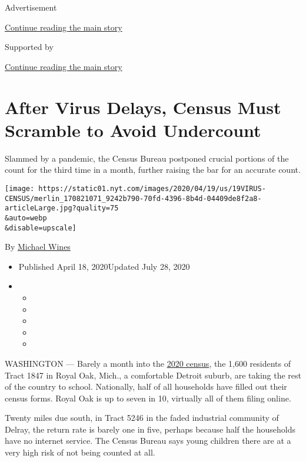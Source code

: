 Advertisement

\protect\hyperlink{after-top}{Continue reading the main story}

Supported by

\protect\hyperlink{after-sponsor}{Continue reading the main story}

\hypertarget{after-virus-delays-census-must-scramble-to-avoid-undercount}{%
\section{After Virus Delays, Census Must Scramble to Avoid
Undercount}\label{after-virus-delays-census-must-scramble-to-avoid-undercount}}

Slammed by a pandemic, the Census Bureau postponed crucial portions of
the count for the third time in a month, further raising the bar for an
accurate count.

\texttt{[image: https://static01.nyt.com/images/2020/04/19/us/19VIRUS-CENSUS/merlin\_170821071\_9242b790-70fd-4396-8b4d-04409de8f2a8-articleLarge.jpg?quality=75\\\&auto=webp\\\&disable=upscale]}

By \href{https://www.nytimes.com/by/michael-wines}{Michael Wines}

\begin{itemize}
\item
  Published April 18, 2020Updated July 28, 2020
\item
  \begin{itemize}
  \item
  \item
  \item
  \item
  \item
  \end{itemize}
\end{itemize}

WASHINGTON --- Barely a month into the
\href{https://www.nytimes.com/2020/07/28/us/trump-census.html}{2020
census}, the 1,600 residents of Tract 1847 in Royal Oak, Mich., a
comfortable Detroit suburb, are taking the rest of the country to
school. Nationally, half of all households have filled out their census
forms. Royal Oak is up to seven in 10, virtually all of them filing
online.

Twenty miles due south, in Tract 5246 in the faded industrial community
of Delray, the return rate is barely one in five, perhaps because half
the households have no internet service. The Census Bureau says young
children there are at a very high risk of not being counted at all.

